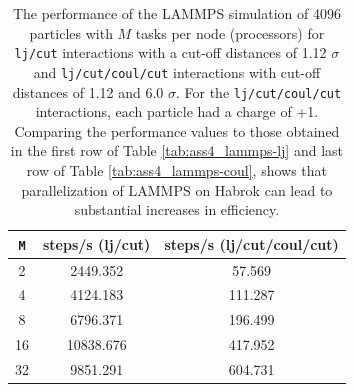 \documentclass[10pt,a4paper]{labreport}
\begin{document}
\begin{enumerate}
\begin{table}[htb]
  \caption{The performance of the LAMMPS simulation of 4096 particles with $M$ tasks per node (processors) for \texttt{lj/cut} interactions with a cut-off distances of 1.12 $\sigma$ and \texttt{lj/cut/coul/cut} interactions with cut-off distances of 1.12 and 6.0 $\sigma$. For the \texttt{lj/cut/coul/cut} interactions, each particle had a charge of +1. 
  Comparing the performance values to those obtained in the first row of Table \ref{tab:ass4_lammps-lj} and last row of Table \ref{tab:ass4_lammps-coul}, shows that parallelization of LAMMPS on Habrok can lead to substantial increases in efficiency.}
  \label{tab:ass4_lammps-nproc}
  \centering
  \begin{tabular}{ccc} \hline
    \textbf{\texttt{M}} & \textbf{steps/s (lj/cut) }& \textbf{steps/s (lj/cut/coul/cut)}\\
    \hline
    2                        & 2449.352      &       57.569          \\
    4                         & 4124.183       &      111.287           \\
    8                         & 6796.371      &      196.499              \\
    16                         & 10838.676      &     417.952              \\ 
    32                        &  9851.291        &  604.731\\ \hline
    \end{tabular}
\end{table}
\end{enumerate}

\newpage

%   
\end{document}
